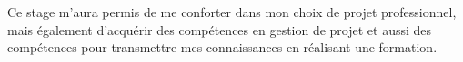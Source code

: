 \documentclass[12pt,titlepage]{article}
\numberwithin{figure}{subsubsection} %
\numberwithin{table}{subsubsection}
\begin{document}
\vspace{0.5cm}
Ce stage m’aura permis  de me conforter dans mon choix de projet professionnel, mais également d’acquérir des compétences en gestion de projet et aussi des compétences pour transmettre mes connaissances en réalisant une formation.
\newpage



\newpage







\newpage
\thispagestyle{empty}
\printbibliography
\end{document}

